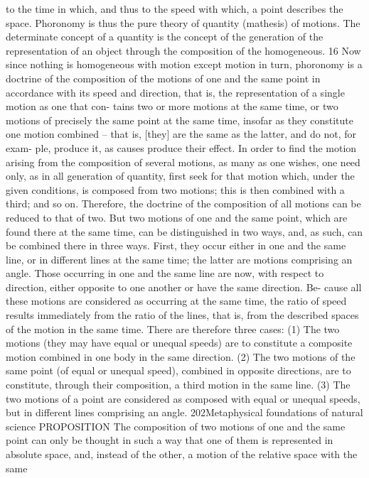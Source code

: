 to the time in which, and thus to the speed with which, a point describes
the space. Phoronomy is thus the pure theory of quantity (mathesis) of
motions. The determinate concept of a quantity is the concept of the
generation of the representation of an object through the composition
of the homogeneous. 16 Now since nothing is homogeneous with motion
except motion in turn, phoronomy is a doctrine of the composition of
the motions of one and the same point in accordance with its speed and
direction, that is, the representation of a single motion as one that con-
tains two or more motions at the same time, or two motions of precisely
the same point at the same time, insofar as they constitute one motion
combined – that is, [they] are the same as the latter, and do not, for exam-
ple, produce it, as causes produce their effect. In order to ﬁnd the motion
arising from the composition of several motions, as many as one wishes,
one need only, as in all generation of quantity, ﬁrst seek for that motion
which, under the given conditions, is composed from two motions; this
is then combined with a third; and so on. Therefore, the doctrine of
the composition of all motions can be reduced to that of two. But two
motions of one and the same point, which are found there at the same
time, can be distinguished in two ways, and, as such, can be combined
there in three ways. First, they occur either in one and the same line, or
in different lines at the same time; the latter are motions comprising an
angle. Those occurring in one and the same line are now, with respect to
direction, either opposite to one another or have the same direction. Be-
cause all these motions are considered as occurring at the same time, the
ratio of speed results immediately from the ratio of the lines, that is, from
the described spaces of the motion in the same time. There are therefore
three cases: (1) The two motions (they may have equal or unequal speeds)
are to constitute a composite motion combined in one body in the same
direction. (2) The two motions of the same point (of equal or unequal
speed), combined in opposite directions, are to constitute, through their
composition, a third motion in the same line. (3) The two motions of a
point are considered as composed with equal or unequal speeds, but in
different lines comprising an angle.
202Metaphysical foundations of natural science
PROPOSITION
The composition of two motions of one and the same point can only be
thought in such a way that one of them is represented in absolute space,
and, instead of the other, a motion of the relative space with the same

